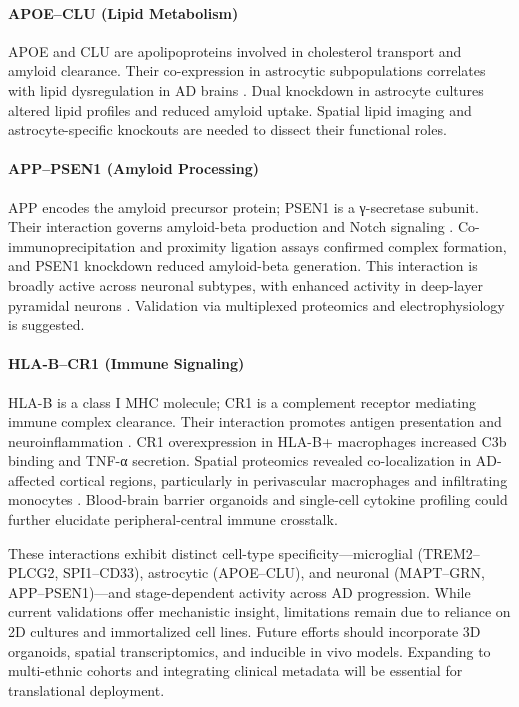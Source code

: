 \documentclass[12pt]{article}
\begin{document}
\paragraph{APOE–CLU (Lipid Metabolism)}
APOE and CLU are apolipoproteins involved in cholesterol transport and amyloid clearance. Their co-expression in astrocytic subpopulations correlates with lipid dysregulation in AD brains \citep{geneCardsAPOE, reactomeAPOECLU, lau2020astrocyte}. Dual knockdown in astrocyte cultures altered lipid profiles and reduced amyloid uptake. Spatial lipid imaging and astrocyte-specific knockouts are needed to dissect their functional roles.

\paragraph{APP–PSEN1 (Amyloid Processing)}
APP encodes the amyloid precursor protein; PSEN1 is a γ-secretase subunit. Their interaction governs amyloid-beta production and Notch signaling \citep{reactomeAPPPSEN1, geneCardsAPP}. Co-immunoprecipitation and proximity ligation assays confirmed complex formation, and PSEN1 knockdown reduced amyloid-beta generation. This interaction is broadly active across neuronal subtypes, with enhanced activity in deep-layer pyramidal neurons \citep{zhang2015structure}. Validation via multiplexed proteomics and electrophysiology is suggested.

\paragraph{HLA-B–CR1 (Immune Signaling)}
HLA-B is a class I MHC molecule; CR1 is a complement receptor mediating immune complex clearance. Their interaction promotes antigen presentation and neuroinflammation \citep{reactomeHLABCR1, geneCardsCR1}. CR1 overexpression in HLA-B+ macrophages increased C3b binding and TNF-α secretion. Spatial proteomics revealed co-localization in AD-affected cortical regions, particularly in perivascular macrophages and infiltrating monocytes \citep{gate2020peripheral}. Blood-brain barrier organoids and single-cell cytokine profiling could further elucidate peripheral-central immune crosstalk.

These interactions exhibit distinct cell-type specificity—microglial (TREM2–PLCG2, SPI1–CD33), astrocytic (APOE–CLU), and neuronal (MAPT–GRN, APP–PSEN1)—and stage-dependent activity across AD progression. While current validations offer mechanistic insight, limitations remain due to reliance on 2D cultures and immortalized cell lines. Future efforts should incorporate 3D organoids, spatial transcriptomics, and inducible in vivo models. Expanding to multi-ethnic cohorts and integrating clinical metadata will be essential for translational deployment.
\end{document}
